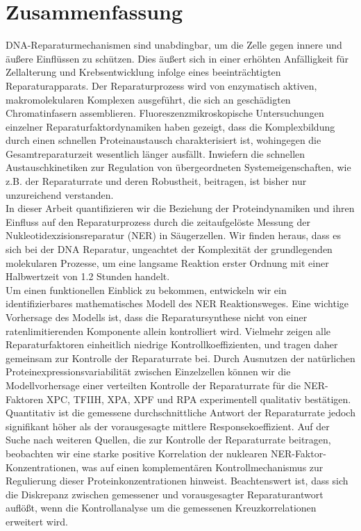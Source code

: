 \chapter*{Zusammenfassung}
\thispagestyle{plain2}


DNA-Reparaturmechanismen sind unabdingbar, um die Zelle gegen innere und \"{a}u\ss{}ere Einfl\"{u}ssen zu sch\"{u}tzen. Dies \"{a}u\ss{}ert sich in einer erh\"{o}hten Anf\"{a}lligkeit f\"{u}r Zellalterung und Krebsentwicklung infolge eines beeintr\"{a}chtigten Reparaturapparats. Der Reparaturprozess wird von enzymatisch aktiven, makromolekularen Komplexen ausgef\"{u}hrt, die sich an gesch\"{a}digten Chromatinfasern assemblieren. Fluoreszenzmikroskopische Untersuchung\-en einzelner Reparaturfaktordynamiken haben gezeigt, dass die Komplexbildung durch einen schnellen Proteinaustausch charakterisiert ist, wohingegen die Gesamtreparaturzeit wesentlich l\"{a}nger ausf\"{a}llt. Inwiefern die schnellen Austauschkinetiken zur Regulation von \"{u}bergeordneten Systemeigenschaften, wie z.B. der Reparaturrate und deren Robustheit, beitragen, ist bisher nur unzureichend verstanden.\\
In dieser Arbeit quantifizieren wir die Beziehung der Proteindynamiken und ihren Einfluss auf den Reparaturprozess durch die zeitaufgel\"{o}ste Messung der Nukleotidexzisionsreparatur (NER) in S\"{a}ugerzellen. Wir finden heraus, dass es sich bei der DNA Reparatur, ungeachtet der Komplexit\"{a}t der grundlegenden molekularen Prozesse, um eine langsame Reaktion erster Ordnung mit einer Halb\-wertzeit von 1.2 Stunden handelt.\\  
Um einen funktionellen Einblick zu bekommen, entwickeln wir ein identifizierbares ma\-the\-matisches Modell des NER Reaktionsweges. Eine wichtige Vorhersage des Modells ist, dass die Reparatursynthese nicht von einer ratenlimitierenden Komponente allein kontrolliert wird. Vielmehr zeigen alle Reparaturfaktoren einheitlich niedrige Kontrollkoeffizienten, und tragen daher gemeinsam zur Kontrolle der Reparaturrate bei. Durch Ausnutzen der nat\"{u}rlichen Proteinexpressionsvariabilit\"{a}t zwischen Einzelzellen k\"{o}nnen wir die Modell\-vorhersage einer verteilten Kontrolle der Reparaturrate f\"{u}r die NER-Faktoren XPC, TFIIH, XPA, XPF und RPA experimentell qualitativ best\"{a}tigen. Quantitativ ist die gemessene durchschnittliche Antwort der Reparaturrate jedoch signifikant h\"{o}her als der vorausgesagte mittlere Responsekoeffizient. Auf der Suche nach weiteren Quellen, die zur Kontrolle der Reparaturrate beitragen, beobachten wir eine starke positive Korrelation der nu\-klearen NER-Faktor-Konzentrationen, was auf einen komplement\"{a}ren Kontrollmechanismus zur Regulierung dieser Proteinkonzentrationen hinweist. Beachtenswert ist, dass sich die Diskrepanz zwischen gemessener und vorausgesagter Reparaturantwort aufl\"{o}\ss{}t, wenn die Kontrollanalyse um die gemessenen Kreuzkorrelationen erweitert wird.\\              
